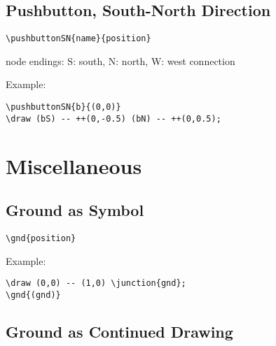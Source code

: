\documentclass[parskip=full]{scrartcl}
\begin{document}
\subsection{Pushbutton, South-North Direction}

\begin{verbatim}
\pushbuttonSN{name}{position}
\end{verbatim}
node endings: S: south, N: north, W: west connection

Example:\\
\begin{minipage}{0.8\textwidth}
\begin{verbatim}
\pushbuttonSN{b}{(0,0)}
\draw (bS) -- ++(0,-0.5) (bN) -- ++(0,0.5);
\end{verbatim}
\end{minipage}
\begin{minipage}{0.19\textwidth}
\end{minipage}

\section{Miscellaneous}

\subsection{Ground as Symbol}

\begin{verbatim}
\gnd{position}
\end{verbatim}

Example:\\
\begin{minipage}{0.8\textwidth}
\begin{verbatim}
\draw (0,0) -- (1,0) \junction{gnd};
\gnd{(gnd)}
\end{verbatim}
\end{minipage}
\begin{minipage}{0.19\textwidth}
\end{minipage}

\subsection{Ground as Continued Drawing}
\end{document}
